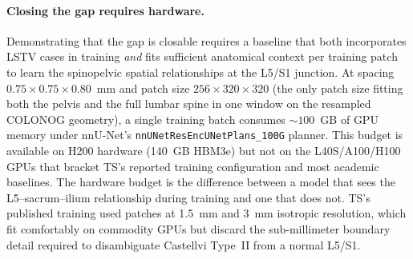 \documentclass{article}
\begin{document}
\paragraph{Closing the gap requires hardware.}
Demonstrating that the gap is closable requires a baseline that
both incorporates LSTV cases in training \emph{and} fits sufficient
anatomical context per training patch to learn the spinopelvic
spatial relationships at the L5/S1 junction.
At spacing $0.75\!\times\!0.75\!\times\!0.80$~mm and patch size
$256\!\times\!320\!\times\!320$ (the only patch size fitting both the
pelvis and the full lumbar spine in one window on the resampled
COLONOG geometry), a single training batch consumes
${\sim}100$~GB of GPU memory under nnU-Net's
\texttt{nnUNetResEncUNetPlans\_100G} planner.
This budget is available on H200 hardware (140~GB HBM3e) but not
on the L40S/A100/H100 GPUs that bracket TS's reported training
configuration and most academic baselines.
The hardware budget is the difference between a model that sees
the L5--sacrum--ilium relationship during training and one that
does not.
TS's published training used patches at 1.5~mm and 3~mm isotropic
resolution, which fit comfortably on commodity GPUs but discard
the sub-millimeter boundary detail required to disambiguate
Castellvi Type~II from a normal L5/S1.
\end{document}
